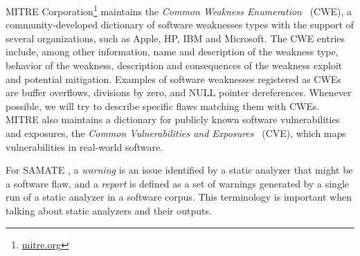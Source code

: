 MITRE Corporation\footnote{\url{mitre.org}} maintains the \textit{Common Weakness
Enumeration}~\cite{cwe_page} (CWE), a community-developed dictionary of
software weaknesses types with the support of several organizations, such as Apple,
HP, IBM and Microsoft. The CWE entries include, among other information, name
and description of the weakness type, behavior of the weakness, description and
consequences of the weakness exploit and potential mitigation. Examples of
software weaknesses registered as CWEs are buffer overflows, divisions by zero,
and NULL pointer dereferences. Whenever possible, we will try to describe
specific flaws matching them with CWEs. MITRE also maintains a dictionary for
publicly known software vulnerabilities and exposures, the \textit{Common
Vulnerabilities and Exposures}~\cite{cve_page} (CVE), which maps vulnerabilities
in real-world software.

For SAMATE \cite{black_counting_2011}, a \textit{warning} is an issue identified
by a static analyzer that might be a software flaw, and a \textit{report} is
defined as a set of warnings generated by a single run of a static analyzer in
a software corpus. This terminology is important when talking about static
analyzers and their outputs.




